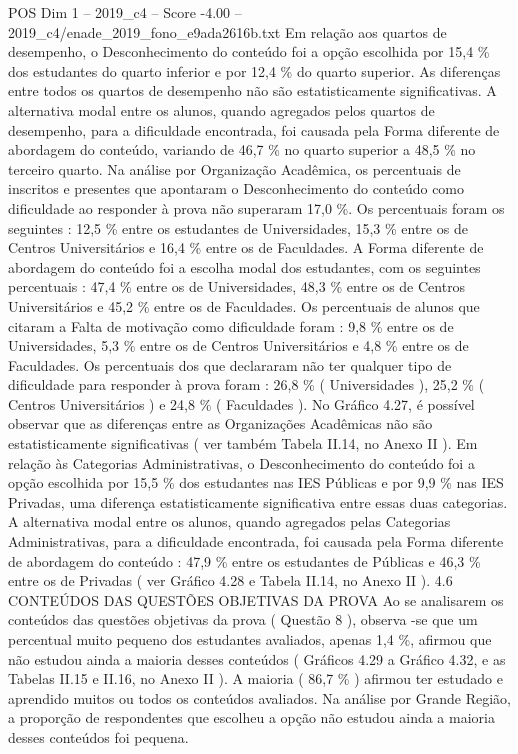 \begin{textsample}{POS Dim 1 – 2019\_c4 – Score -4.00 – 2019\_c4/enade\_2019\_fono\_e9ada2616b.txt}
Em relação aos quartos de desempenho, o Desconhecimento do conteúdo foi a opção escolhida por 15,4 \% dos estudantes do quarto inferior e por 12,4 \% do quarto superior.
As diferenças entre todos os quartos de desempenho não são estatisticamente significativas.
A alternativa modal entre os alunos, quando agregados pelos quartos de desempenho, para a dificuldade encontrada, foi causada pela Forma diferente de abordagem do conteúdo, variando de 46,7 \% no quarto superior a 48,5 \% no terceiro quarto.
Na análise por Organização Acadêmica, os percentuais de inscritos e presentes que apontaram o Desconhecimento do conteúdo como dificuldade ao responder à prova não superaram 17,0 \%.
Os percentuais foram os seguintes : 12,5 \% entre os estudantes de Universidades, 15,3 \% entre os de Centros Universitários e 16,4 \% entre os de Faculdades.
A Forma diferente de abordagem do conteúdo foi a escolha modal dos estudantes, com os seguintes percentuais : 47,4 \% entre os de Universidades, 48,3 \% entre os de Centros Universitários e 45,2 \% entre os de Faculdades.
Os percentuais de alunos que citaram a Falta de motivação como dificuldade foram : 9,8 \% entre os de Universidades, 5,3 \% entre os de Centros Universitários e 4,8 \% entre os de Faculdades.
Os percentuais dos que declararam não ter qualquer tipo de dificuldade para responder à prova foram : 26,8 \% ( Universidades ), 25,2 \% ( Centros Universitários ) e 24,8 \% ( Faculdades ).
No Gráfico 4.27, é possível observar que as diferenças entre as Organizações Acadêmicas não são estatisticamente significativas ( ver também Tabela II.14, no Anexo II ).
Em relação às Categorias Administrativas, o Desconhecimento do conteúdo foi a opção escolhida por 15,5 \% dos estudantes nas IES Públicas e por 9,9 \% nas IES Privadas, uma diferença estatisticamente significativa entre essas duas categorias.
A alternativa modal entre os alunos, quando agregados pelas Categorias Administrativas, para a dificuldade encontrada, foi causada pela Forma diferente de abordagem do conteúdo : 47,9 \% entre os estudantes de Públicas e 46,3 \% entre os de Privadas ( ver Gráfico 4.28 e Tabela II.14, no Anexo II ). 4.6 CONTEÚDOS DAS QUESTÕES OBJETIVAS DA PROVA Ao se analisarem os conteúdos das questões objetivas da prova ( Questão 8 ), observa -se que um percentual muito pequeno dos estudantes avaliados, apenas 1,4 \%, afirmou que não estudou ainda a maioria desses conteúdos ( Gráficos 4.29 a Gráfico 4.32, e as Tabelas II.15 e II.16, no Anexo II ).
A maioria ( 86,7 \% ) afirmou ter estudado e aprendido muitos ou todos os conteúdos avaliados.
Na análise por Grande Região, a proporção de respondentes que escolheu a opção não estudou ainda a maioria desses conteúdos foi pequena.

\end{textsample}
